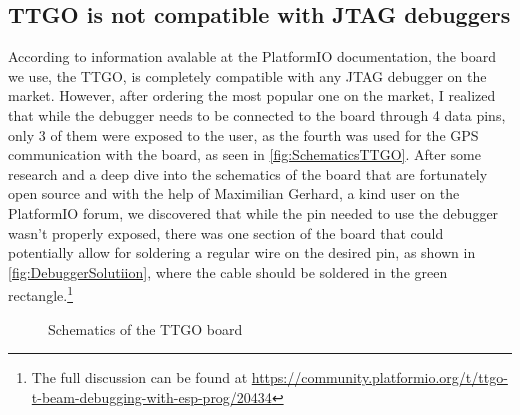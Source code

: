 \subsection{TTGO is not compatible with JTAG debuggers}
According to information avalable at the PlatformIO documentation, the board we use, the TTGO, is completely compatible with any JTAG debugger on the market. However, after ordering the most popular one on the market, I realized that while the debugger needs to be connected to the board through 4 data pins, only 3 of them were exposed to the user, as the fourth was used for the GPS communication with the board, as seen in \autoref{fig:SchematicsTTGO}. After some research and a deep dive into the schematics of the board that are fortunately open source and with the help of Maximilian Gerhard, a kind user on the PlatformIO forum, we discovered that while the pin needed to use the debugger wasn't properly exposed, there was one section of the board that could potentially allow for soldering a regular wire on the desired pin, as shown in \autoref{fig:DebuggerSolutiion}, where the cable should be soldered in the green rectangle.\footnote{The full discussion can be found at \url{https://community.platformio.org/t/ttgo-t-beam-debugging-with-esp-prog/20434}}
\begin{figure}[h!]
    \centering
    \advance\leftskip-4cm
    \advance\rightskip-4cm
    \qquad
    \caption{Schematics of the TTGO board \cite{TTGOSchematics}}%
    \label{fig:SchematicsTTGO}%
\end{figure}

